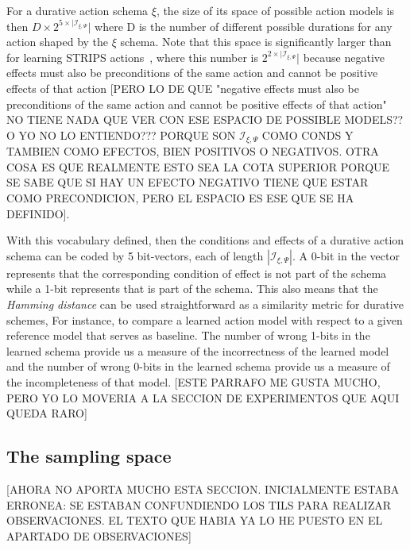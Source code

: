 \documentclass{ecai}
\begin{document}
For a durative action schema $\xi$, the size of its space of possible action models is then $D\times 2^{5\times|{\mathcal I}_{\xi,\Psi}}|$ where D is the number of different possible durations for any action shaped by the $\xi$ schema. Note that this space is significantly larger than for learning STRIPS actions~\cite{yang2007learning}, where this number is $2^{2\times|{\mathcal I}_{\xi,\Psi}}|$ because negative effects must also be preconditions of the same action and cannot be positive effects of that action [PERO LO DE QUE "negative effects must also be preconditions of the same action and cannot be positive effects of that action" NO TIENE NADA QUE VER CON ESE ESPACIO DE POSSIBLE MODELS?? O YO NO LO ENTIENDO??? PORQUE SON $\mathcal {I}_{\xi,\Psi}$ COMO CONDS Y TAMBIEN COMO EFECTOS, BIEN POSITIVOS O NEGATIVOS. OTRA COSA ES QUE REALMENTE ESTO SEA LA COTA SUPERIOR PORQUE SE SABE QUE SI HAY UN EFECTO NEGATIVO TIENE QUE ESTAR COMO PRECONDICION, PERO EL ESPACIO ES ESE QUE SE HA DEFINIDO].

With this vocabulary defined, then the conditions and effects of a durative action schema can be coded by 5 bit-vectors, each of length $|{\mathcal I}_{\xi,\Psi}|$. A 0-bit in the vector represents that the corresponding condition of effect is not part of the schema while a 1-bit represents that is part of the schema. This also means that the {\em Hamming distance} can be used straightforward as a similarity metric for durative schemes, For instance, to compare a learned action model with respect to a given reference model that serves as baseline. The number of wrong 1-bits in the learned schema provide us a measure of the incorrectness of the learned model and the number of wrong 0-bits in the learned schema provide us a measure of the incompleteness of that model. [ESTE PARRAFO ME GUSTA MUCHO, PERO YO LO MOVERIA A LA SECCION DE EXPERIMENTOS QUE AQUI QUEDA RARO]



\subsection{The sampling space}
\label{sec:sampling-space}

[AHORA NO APORTA MUCHO ESTA SECCION. INICIALMENTE ESTABA ERRONEA: SE ESTABAN CONFUNDIENDO LOS TILS PARA REALIZAR OBSERVACIONES. EL TEXTO QUE HABIA YA LO HE PUESTO EN EL APARTADO DE OBSERVACIONES]

\end{document}

